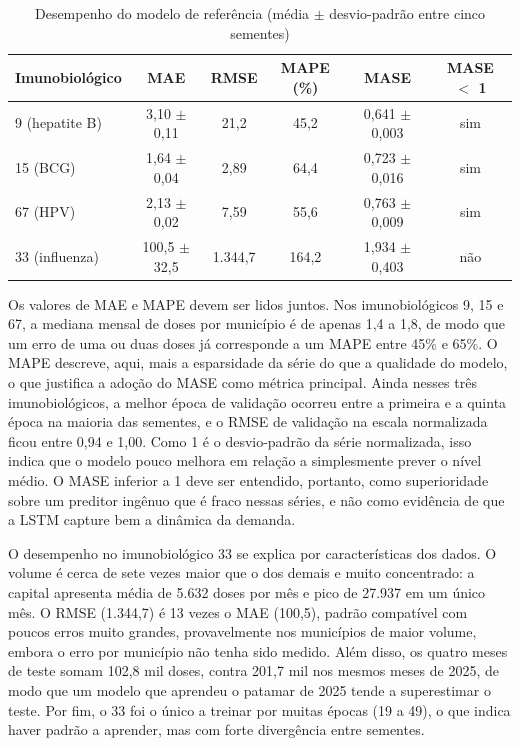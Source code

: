 \documentclass[
    12pt,
    openright,
    oneside,
    a4paper,
    english,
    brazil
]{abntex2}
\begin{document}
\begin{table}[htb]
  \centering
  \caption{Desempenho do modelo de referência (média $\pm$ desvio-padrão entre cinco sementes)}
  \label{tab:baseline}
  \footnotesize
  \begin{tabular}{lccccc}
    \toprule
    \textbf{Imunobiológico} & \textbf{MAE} & \textbf{RMSE} & \textbf{MAPE (\%)} & \textbf{MASE} & \textbf{MASE $<$ 1} \\
    \midrule
    9 (hepatite B) & 3,10 $\pm$ 0,11 & 21,2 & 45,2 & 0,641 $\pm$ 0,003 & sim \\
    15 (BCG) & 1,64 $\pm$ 0,04 & 2,89 & 64,4 & 0,723 $\pm$ 0,016 & sim \\
    67 (HPV) & 2,13 $\pm$ 0,02 & 7,59 & 55,6 & 0,763 $\pm$ 0,009 & sim \\
    33 (influenza) & 100,5 $\pm$ 32,5 & 1.344,7 & 164,2 & 1,934 $\pm$ 0,403 & não \\
    \bottomrule
  \end{tabular}
\end{table}

Os valores de MAE e MAPE devem ser lidos juntos. Nos imunobiológicos 9, 15 e 67, a mediana mensal de doses por município é de apenas 1,4 a 1,8, de modo que um erro de uma ou duas doses já corresponde a um MAPE entre 45\% e 65\%. O MAPE descreve, aqui, mais a esparsidade da série do que a qualidade do modelo, o que justifica a adoção do MASE como métrica principal. Ainda nesses três imunobiológicos, a melhor época de validação ocorreu entre a primeira e a quinta época na maioria das sementes, e o RMSE de validação na escala normalizada ficou entre 0,94 e 1,00. Como 1 é o desvio-padrão da série normalizada, isso indica que o modelo pouco melhora em relação a simplesmente prever o nível médio. O MASE inferior a 1 deve ser entendido, portanto, como superioridade sobre um preditor ingênuo que é fraco nessas séries, e não como evidência de que a LSTM capture bem a dinâmica da demanda.

O desempenho no imunobiológico 33 se explica por características dos dados. O volume é cerca de sete vezes maior que o dos demais e muito concentrado: a capital apresenta média de 5.632 doses por mês e pico de 27.937 em um único mês. O RMSE (1.344,7) é 13 vezes o MAE (100,5), padrão compatível com poucos erros muito grandes, provavelmente nos municípios de maior volume, embora o erro por município não tenha sido medido. Além disso, os quatro meses de teste somam 102,8 mil doses, contra 201,7 mil nos mesmos meses de 2025, de modo que um modelo que aprendeu o patamar de 2025 tende a superestimar o teste. Por fim, o 33 foi o único a treinar por muitas épocas (19 a 49), o que indica haver padrão a aprender, mas com forte divergência entre sementes.
\end{document}
